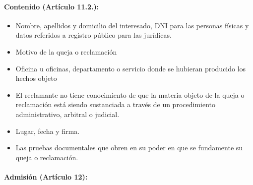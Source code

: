 \documentclass[
]{article}
\providecommand{\tightlist}{%
  \setlength{\itemsep}{0pt}\setlength{\parskip}{0pt}}
\begin{document}
\hypertarget{contenido-artuxedculo-11.2.}{%
\paragraph{\texorpdfstring{Contenido (\textbf{Artículo
11.2.}):}{Contenido (Artículo 11.2.):}}\label{contenido-artuxedculo-11.2.}}

\begin{itemize}
\tightlist
\item
  Nombre, apellidos y domicilio del interesado, DNI para las personas
  físicas y datos referidos a registro público para las jurídicas.
\item
  Motivo de la queja o reclamación
\item
  Oficina u oficinas, departamento o servicio donde se hubieran
  producido los hechos objeto
\item
  El reclamante no tiene conocimiento de que la materia objeto de la
  queja o reclamación está siendo sustanciada a través de un
  procedimiento administrativo, arbitral o judicial.
\item
  Lugar, fecha y firma.
\item
  Las pruebas documentales que obren en su poder en que se fundamente su
  queja o reclamación.
\end{itemize}

\hypertarget{admisiuxf3n-artuxedculo-12}{%
\paragraph{\texorpdfstring{Admisión (\textbf{Artículo
12}):}{Admisión (Artículo 12):}}\label{admisiuxf3n-artuxedculo-12}}
\end{document}

